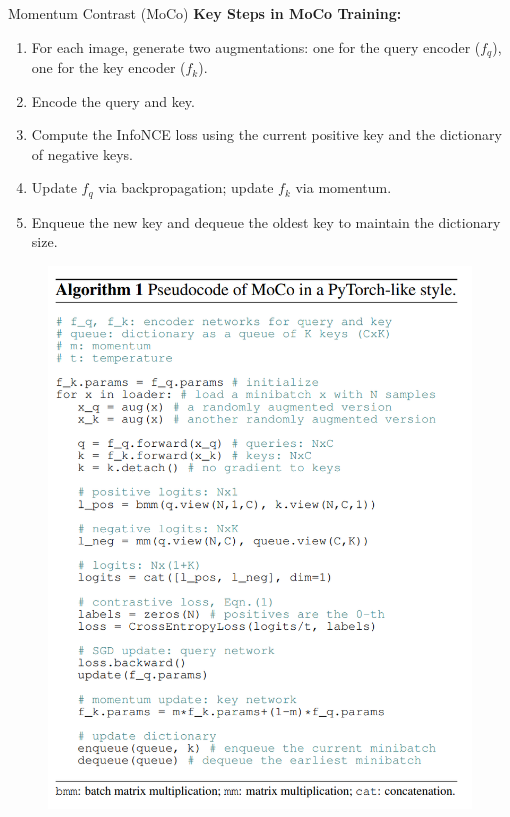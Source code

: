 \begin{frame}[allowframebreaks]{Momentum Contrast (MoCo)}
    \textbf{Key Steps in MoCo Training:}
    \begin{enumerate}
        \item For each image, generate two augmentations: one for the query encoder ($f_q$), one for the key encoder ($f_k$).
        \item Encode the query and key.
        \item Compute the InfoNCE loss using the current positive key and the dictionary of negative keys.
        \item Update $f_q$ via backpropagation; update $f_k$ via momentum.
        \item Enqueue the new key and dequeue the oldest key to maintain the dictionary size.
    \end{enumerate}

    \framebreak

    \begin{figure}
        \centering
        \includegraphics[width=1\linewidth,height=0.95\textheight,keepaspectratio]{images/ssl/slide_68_1_img.png}
    \end{figure}


\end{frame}
